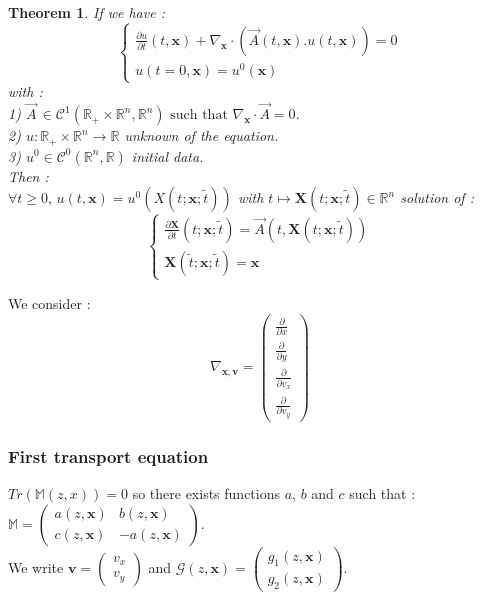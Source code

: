 \documentclass[10pt]{article}
\newcommand{\D}{{\partial}}
\newtheorem{theorem}{Theorem}
\begin{document}
\begin{theorem}
If we have : 
$$\left\lbrace \begin{array}{l}
\frac{\D u}{\D t}(t,\mathbf{x}) + \nabla_{\mathbf{x}} \cdot \left(\stackrel{\rightarrow}{A}(t,\mathbf{x}).u(t,\mathbf{x}) \right) = 0 \\
u(t=0,\mathbf{x}) = u^0(\mathbf{x})
\end{array}
\right.$$
with : \\ 1) $\stackrel{\rightarrow}{A}\,\in\mathcal{C}^1\left(\mathbb{R}_{+}\times\mathbb{R}^n,\mathbb{R}^n\right) \mbox{ such that } \nabla_{\mathbf{x}}\cdot\stackrel{\rightarrow}{A} = 0$. \\
2) $u : \mathbb{R}_{+}\times\mathbb{R}^n\rightarrow\mathbb{R}$ unknown of the equation. \\
3) $u^0\in\mathcal{C}^{0}\left(\mathbb{R}^n,\mathbb{R}\right)$ initial data. \\
Then : \\ $\forall t\geqslant 0,\, u(t,\mathbf{x}) = u^0\left(X(t;\mathbf{x};\tilde{t})\right)$ with $t\mapsto \mathbf{X}(t;\mathbf{x};\tilde{t})\in\mathbb{R}^{n}$ solution of : \\
$$\left\lbrace \begin{array}{l}
\frac{\D \mathbf{X}}{\D t}(t;\mathbf{x};\tilde{t}) = \stackrel{\rightarrow}{A}\left(t,\mathbf{X}(t;\mathbf{x};\tilde{t})\right) \\
\mathbf{X}(\tilde{t};\mathbf{x};\tilde{t}) = \mathbf{x}
\end{array}\right. $$
\end{theorem}

We consider :
$$\nabla_{\mathbf{x,v}} = \left(\begin{array}{c}
\frac{\D}{\D x} \\ \frac{\D}{\D y} \\ \frac{\D}{\D v_x} \\ \frac{\D}{\D v_y}
\end{array}\right)$$


\subsubsection{First transport equation}


$Tr(\mathbb{M}(z,x)) = 0$ so there exists functions $a$, $b$ and $c$ such that : $\mathbb{M} = \left(\begin{array}{cc}
a(z,\mathbf{x}) & b(z,\mathbf{x}) \\ c(z,\mathbf{x}) & -a(z,\mathbf{x})
\end{array}\right)$. \\
We write $\mathbf{v} = \left(\begin{array}{c}
v_x \\ v_y
\end{array}\right)$ and $\mathcal{G}(z,\mathbf{x}) = \left(\begin{array}{c}
g_1(z,\mathbf{x}) \\ g_2(z,\mathbf{x})
\end{array}\right)$. \\ \\
\end{document}
